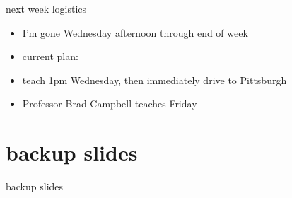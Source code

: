 \begin{frame}{next week logistics}
    \begin{itemize}
    \item I'm gone Wednesday afternoon through end of week
    \item current plan:
    \vspace{.5cm}
    \item teach 1pm Wednesday, then immediately drive to Pittsburgh
    \item Professor Brad Campbell teaches Friday
    \end{itemize}
\end{frame}



\section{backup slides}
\begin{frame}{backup slides}
\end{frame}


